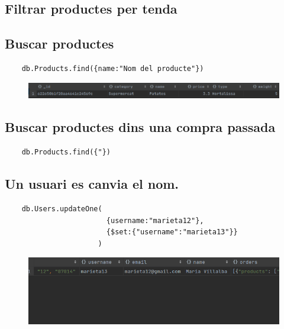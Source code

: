 \subsection{Filtrar productes per tenda}

\subsection{Buscar productes}

\begin{verbatim}
    db.Products.find({name:"Nom del producte"})
\end{verbatim}

\begin{figure}
    \centering
    \includegraphics[width=400pt]{figures/Buscar productes.png}
\end{figure}

\subsection{Buscar productes dins una compra passada}

\begin{verbatim}
    db.Products.find({"})
\end{verbatim}

\subsection{Un usuari es canvia el nom.}

\begin{verbatim}
    db.Users.updateOne(
                        {username:"marieta12"},
                        {$set:{"username":"marieta13"}}
                      )
\end{verbatim}

\begin{figure}
    \centering
    \includegraphics[width=400pt]{figures/maria.png}
\end{figure}

\subsection{}